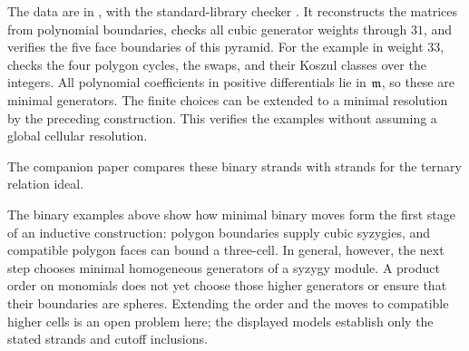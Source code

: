 \begin{example}
The data are in
, with the
standard-library checker
. It reconstructs the
matrices from polynomial boundaries, checks all cubic generator
weights through $31$, and verifies the five face boundaries of this
pyramid. For the example in weight $33$, 
checks the four polygon cycles, the swaps, and their Koszul classes over the integers. All polynomial
coefficients in positive differentials lie in $\mathfrak m$, so these are
minimal generators. The finite choices can be extended to a minimal
resolution by the preceding construction. This verifies the examples
without assuming a global cellular resolution.
\end{example}

The companion paper \cite{CompanionTopology} compares these binary
strands with strands for the ternary relation ideal.

The binary examples above show how minimal binary moves form the first stage of
an inductive construction: polygon boundaries supply cubic syzygies,
and compatible polygon faces can bound a three-cell. In general,
however, the next step chooses minimal homogeneous generators of a
syzygy module. A product order on monomials does not yet choose those
higher generators or ensure that their boundaries are spheres.
Extending the order and the moves to compatible higher cells is an
open problem here; the displayed models establish only the stated
strands and cutoff inclusions.

